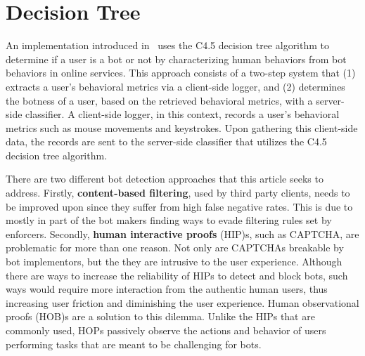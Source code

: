 
\section{Decision Tree}\label{sec:decision-tree}

An implementation introduced in~\cite{bot_or_human} uses the C4.5 decision tree algorithm to determine if a user is a bot or not by characterizing human behaviors from bot behaviors in online services.
This approach consists of a two-step system that (1) extracts a user's behavioral metrics via a client-side logger, and (2) determines the botness of a user, based on the retrieved behavioral metrics, with a server-side classifier.
A client-side logger, in this context, records a user's behavioral metrics such as mouse movements and keystrokes.
Upon gathering this client-side data, the records are sent to the server-side classifier that utilizes the C4.5 decision tree algorithm.

There are two different bot detection approaches that this article seeks to address.
Firstly, \textbf{content-based filtering}, used by third party clients, needs to be improved upon since they suffer from high false negative rates.
This is due to mostly in part of the bot makers finding ways to evade filtering rules set by enforcers.
Secondly, \textbf{human interactive proofs} (HIP)s, such as CAPTCHA, are problematic for more than one reason.
Not only are CAPTCHAs breakable by bot implementors, but the they are intrusive to the user experience.
Although there are ways to increase the reliability of HIPs to detect and block bots, such ways would require more interaction from the authentic human users, thus increasing user friction and diminishing the user experience.
Human observational proofs (HOB)s are a solution to this dilemma.
Unlike the HIPs that are commonly used, HOPs passively observe the actions and behavior of users performing tasks that are meant to be challenging for bots.


